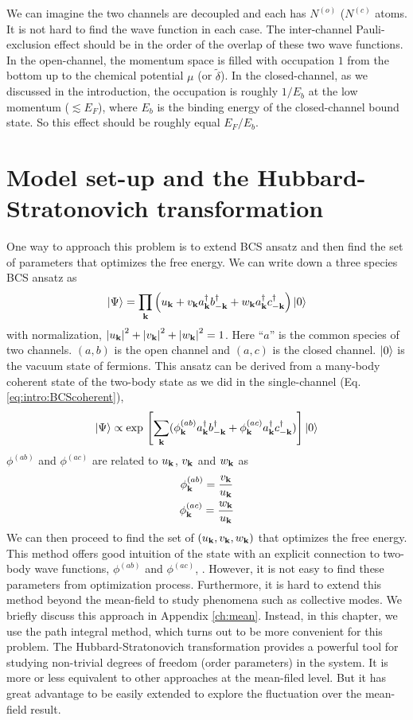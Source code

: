 We can imagine the two channels are decoupled and each has $N^{(o)}$ ($N^{(c)}$ atoms.  It is not hard to find the wave function in each case.  The inter-channel Pauli-exclusion effect should be in the order of the overlap of these two wave functions. In the open-channel, the momentum space is filled  with occupation $1$ from the bottom up to the chemical potential $\mu$ (or $\tilde\delta$). In the closed-channel, as we discussed in the introduction, the occupation is roughly $1/E_b$ at the low momentum ($\lesssim{}E_F$), where $E_b$ is the binding energy of the closed-channel bound state.   So this effect should be roughly equal $E_F/{E_b}$.

\section{Model set-up and the Hubbard-Stratonovich transformation}

One way to approach this problem is to extend BCS ansatz and then find the set of parameters that optimizes the free energy.  We can write down a  three species BCS ansatz as 
\begin{equation}\label{eq:pathInt2:ansatz}
\left|\Psi\right>=\prod_{\mathbf{k}}\left(u_{\mathbf{k}}+v_{\mathbf{k}}{}a^{\dagger}_{\mathbf{k}}{}b^{\dagger}_{-\mathbf{k}}+w_{\mathbf{k}}{}a^{\dagger}_{\mathbf{k}}{}c^{\dagger}_{-\mathbf{k}}\right)\left|0\right>
\end{equation} 
with normalization, $\left\lvert{u_{\ensuremath{\mathbf{k}}}}\right\rvert^2+\left\lvert{v_{\ensuremath{\mathbf{k}}}}\right\rvert^2+\left\lvert{w_{\ensuremath{\mathbf{k}}}}\right\rvert^2=1$.   Here ``$a$'' is the common species of two channels. $(a,b)$ is the open channel and $(a,c)$ is the closed channel.  $\left|0\right>$ is the vacuum state of fermions. This ansatz can be derived from a many-body coherent state of the two-body state as we did in the single-channel (Eq. \ref{eq:intro:BCScoherent}), 
\begin{equation}\label{eq:pathInt2:ansatzCoh}
\left|\Psi\right>\propto\exp{}\left[\sum_{\mathbf{k}}(\phi^{(ab)}_{\mathbf{k}}{}a^{\dagger}_{\mathbf{k}}{}b^{\dagger}_{-\mathbf{k}}+\phi^{(ac)}_{\mathbf{k}}{}a^{\dagger}_{\mathbf{k}}{}c^{\dagger}_{-\mathbf{k}})\right]\left|0\right>
\end{equation} 
$\phi^{(ab)}$ and $\phi^{(ac)}$ are related to $u_{\mathbf{k}}$, $v_{\mathbf{k}}$ and $w_{\mathbf{k}}$ as  
\begin{gather}
\phi_{\mathbf{k}}^{(ab)}=\frac{v_{\mathbf{k}}}{u_{\mathbf{k}}}\\
\phi_{\mathbf{k}}^{(ac)}=\frac{w_{\mathbf{k}}}{u_{\mathbf{k}}}\label{eq:pathInt2:phiWU}
\end{gather}
 We can then proceed to find the set of $(u_{\mathbf{k}},v_{\mathbf{k}},w_{\mathbf{k}})$ that optimizes the free energy. This method offers good intuition of the state  with an explicit connection to two-body wave functions, $\phi^{(ab)}$ and $\phi^{(ac)}$, .  However,  it is not easy to find these parameters from optimization process. Furthermore, it is hard to extend this method beyond the mean-field to study phenomena such as collective modes.  We briefly discuss this approach in Appendix \ref{ch:mean}. Instead, in this chapter, we use the path integral method, which turns out to be  more convenient for this problem.   The Hubbard-Stratonovich transformation provides a powerful tool for studying non-trivial degrees of freedom (order parameters) in the system.  It is more or less equivalent to other approaches at the mean-filed level. But it has great advantage to be easily extended to explore the fluctuation over the mean-field result.  

